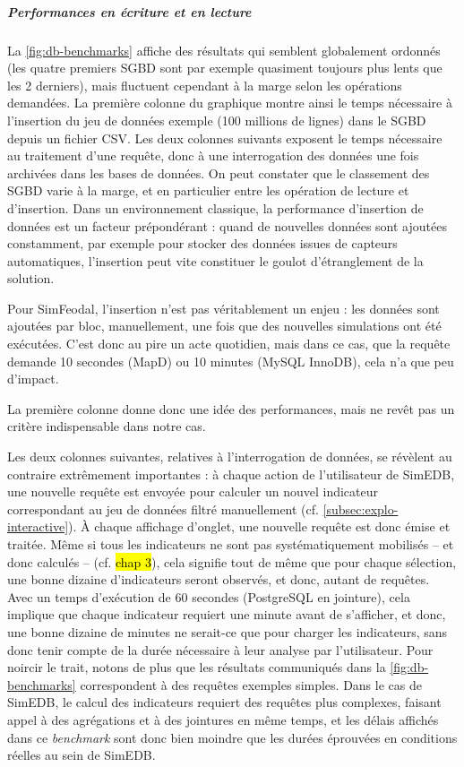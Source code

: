 			\subparagraph{Performances en écriture et en lecture}

			La \cref{fig:db-benchmarks} affiche des résultats qui semblent globalement ordonnés (les quatre premiers SGBD sont par exemple quasiment toujours plus lents que les 2 derniers), mais fluctuent cependant à la marge selon les opérations demandées.
			La première colonne du graphique montre ainsi le temps nécessaire à l'insertion du jeu de données exemple (100 millions de lignes) dans le SGBD depuis un fichier CSV.
			Les deux colonnes suivants exposent le temps nécessaire au traitement d'une requête, donc à une interrogation des données une fois archivées dans les bases de données.
			On peut constater que le classement des SGBD varie à la marge, et en particulier entre les opération de lecture et d'insertion.
			Dans un environnement classique, la performance d'insertion de données est un facteur prépondérant : quand de nouvelles données sont ajoutées constamment, par exemple pour stocker des données issues de capteurs automatiques, l'insertion peut vite constituer le goulot d'étranglement de la solution.

			Pour SimFeodal, l'insertion n'est pas véritablement un enjeu : les données sont ajoutées par bloc, manuellement, une fois que des nouvelles simulations ont été exécutées.
			C'est donc au pire un acte quotidien, mais dans ce cas, que la requête demande 10 secondes (MapD) ou 10 minutes (MySQL InnoDB), cela n'a que peu d'impact.

			La première colonne donne donc une idée des performances, mais ne revêt pas un critère indispensable dans notre cas.

			Les deux colonnes suivantes, relatives à l'interrogation de données, se révèlent au contraire extrêmement importantes : à chaque action de l'utilisateur de SimEDB, une nouvelle requête est envoyée pour calculer un nouvel indicateur correspondant au jeu de données filtré manuellement (cf. \cref{subsec:explo-interactive}).
			À chaque affichage d'onglet, une nouvelle requête est donc émise et traitée. Même si tous les indicateurs ne sont pas systématiquement mobilisés -- et donc calculés -- (cf. \hl{chap 3}), cela signifie tout de même que pour chaque sélection, une bonne dizaine d'indicateurs seront observés, et donc, autant de requêtes.
			Avec un temps d'exécution de 60 secondes (PostgreSQL en \og jointure\fg{}), cela implique que chaque indicateur requiert une minute avant de s'afficher, et donc, une bonne dizaine de minutes ne serait-ce que pour charger les indicateurs, sans donc tenir compte de la durée nécessaire à leur analyse par l'utilisateur.
			Pour noircir le trait, notons de plus que les résultats communiqués dans la \cref{fig:db-benchmarks} correspondent à des requêtes exemples simples.
			Dans le cas de SimEDB, le calcul des indicateurs requiert des requêtes plus complexes, faisant appel à des agrégations et à des jointures en même temps, et les délais affichés dans ce \textit{benchmark} sont donc bien moindre que les durées éprouvées en conditions réelles au sein de SimEDB.

